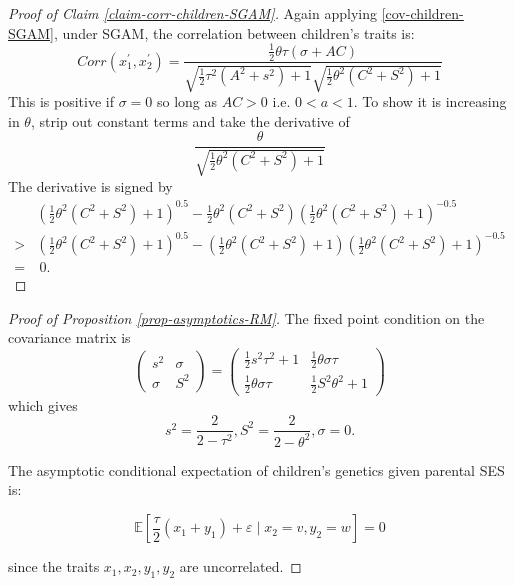 \documentclass[
]{article}
\theoremstyle{definition}
\theoremstyle{definition}
\theoremstyle{definition}
\theoremstyle{definition}
\theoremstyle{remark}
\begin{document}
\begin{proof}[Proof of Claim \ref{claim-corr-children-SGAM}]

Again applying \eqref{cov-children-SGAM}, under SGAM, the correlation between 
children's traits is:
\[
Corr\left( x_{1}^{\prime },x_{2}^{\prime }\right) =\frac{\frac{1}{2}\theta
\tau \left( \sigma +AC\right) }{\sqrt{\frac{1}{2}\tau ^{2}\left(
A^{2}+s^{2}\right) +1}\sqrt{\frac{1}{2}\theta ^{2}\left( C^{2}+S^{2}\right)
+1}} 
\]
This is positive if $\sigma = 0$ so long as $AC > 0$ i.e. $0 < a < 1$. To show
it is increasing in $\theta$, strip out constant terms and take the derivative of
\[
\frac{\theta}{\sqrt{\frac{1}{2}\theta^2(C^2+S^2) + 1}}
\]
The derivative is signed by
\begin{align*}
& \left(\frac{1}{2}\theta^2(C^2+S^2) + 1\right)^{0.5} -
\frac{1}{2}\theta^2(C^2+S^2)\left(\frac{1}{2}\theta^2(C^2+S^2) + 1\right)^{-0.5} \\
>& \left(\frac{1}{2}\theta^2(C^2+S^2) + 1\right)^{0.5} - 
\left(\frac{1}{2}\theta^2(C^2+S^2)  + 1\right)\left(\frac{1}{2}\theta^2(C^2+S^2) + 1\right)^{-0.5} \\
=&\ 0.
\end{align*}
\end{proof}

\begin{proof}[Proof of Proposition \ref{prop-asymptotics-RM}]

The fixed point condition on the covariance matrix is
\[
\left( 
\begin{array}{cc}
s^{2} & \sigma  \\ 
\sigma  & S^{2}%
\end{array}%
\right) =\left( 
\begin{array}{cc}
\frac{1}{2}s^{2}\tau ^{2}+1 & \frac{1}{2}\theta \sigma \tau  \\ 
\frac{1}{2}\theta \sigma \tau  & \frac{1}{2}S^{2}\theta ^{2}+1%
\end{array}%
\right) 
\]
which gives
\[
s^{2}=\frac{2}{2-\tau ^{2}},S^{2}=\frac{2}{2-\theta ^{2}},\sigma =0.
\]

The asymptotic conditional expectation of children's genetics given parental SES is:

\[
\mathbb{E}\left[ \frac{\tau }{2}\left( x_{1}+y_{1}\right) +\varepsilon \mid
x_{2}=v,y_{2}=w\right] =0
\]%

since the traits $x_1,x_2,y_1,y_2$ are uncorrelated.

\end{proof}
\end{document}

